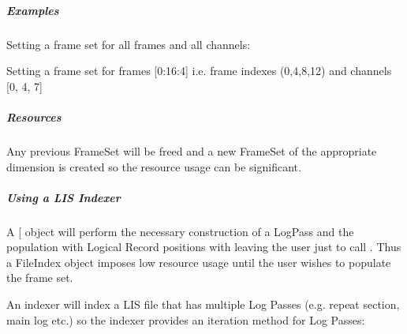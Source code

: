 \documentclass[letterpaper,10pt,english]{sphinxmanual}
\begin{document}
\subparagraph{Examples}
\label{\detokenize{ref/LIS/core/LogPass:examples}}
Setting a frame set for all frames and all channels:

\begin{sphinxVerbatim}[commandchars=\\\{\}]
  
\end{sphinxVerbatim}

Setting a frame set for frames {[}0:16:4{]} i.e. frame indexes (0,4,8,12) and channels {[}0, 4, 7{]}

\begin{sphinxVerbatim}[commandchars=\\\{\}]
  \PYG{p}{[}  \PYG{p}{]}
\end{sphinxVerbatim}


\subparagraph{Resources}
\label{\detokenize{ref/LIS/core/LogPass:id2}}
Any previous FrameSet will be freed and a new FrameSet of the appropriate dimension is created so the resource usage can be significant.


\subparagraph{Using a LIS Indexer}
\label{\detokenize{ref/LIS/core/LogPass:using-a-lis-indexer}}
A {\hyperref[\detokenize{ref/LIS/core/FileIndexer:totaldepth-lis-core-fileindexer}]{}} {[}\sphinxcode{TotalDepth.LIS.core.FileIndexer.FileIndex}{]} object will perform the necessary construction of a LogPass and the population with Logical Record positions with  leaving the user just to call . Thus a FileIndex object imposes low resource usage until the user wishes to populate the frame set.

An indexer will index a LIS file that has multiple Log Passes (e.g. repeat section, main log etc.) so the indexer provides an iteration method for Log Passes:
\end{document}
